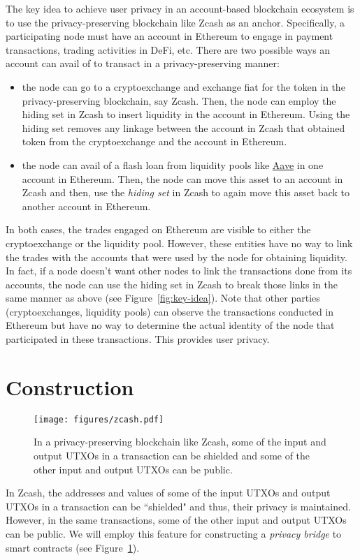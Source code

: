 \documentclass{article}
\begin{document}
The key idea to achieve user privacy in an account-based blockchain ecosystem is to use the privacy-preserving blockchain like Zcash as an anchor. Specifically, a participating node must have an account in Ethereum to engage in payment transactions, trading activities in DeFi, etc. There are two possible ways an account can avail of to transact in a privacy-preserving manner:
\begin{itemize}
    \item the node can go to a cryptoexchange and exchange  fiat  for the token in the privacy-preserving blockchain, say Zcash. Then, the node can employ the {hiding set}  in Zcash to insert liquidity in the account in Ethereum. Using the hiding set removes any linkage between the account in Zcash that obtained token from the cryptoexchange and the account in Ethereum.
    \item the node can avail of a flash loan from liquidity pools like \href{https://aave.com/}{Aave} in one account in Ethereum. Then, the node can move this asset to an account in  Zcash and then, use the {\em hiding set} in Zcash to again move this asset back to another account in Ethereum.
\end{itemize}
In both cases, the trades engaged on Ethereum  are visible to either the cryptoexchange or the liquidity pool. However, these entities have no way to link the trades with the accounts that were used by the node for obtaining liquidity. In fact, if a node doesn't want other nodes to link the transactions done from its accounts, the node can use the hiding set in Zcash to break those links in the same manner as above (see Figure~\ref{fig:key-idea}).
Note that other parties (cryptoexchanges, liquidity pools) can observe the transactions conducted in Ethereum but  have no way to determine the actual identity of the node that participated in these transactions. This provides user privacy.



\section*{Construction}
\begin{figure}
    \centering
    \texttt{[image: figures/zcash.pdf]}
    \caption{In a privacy-preserving blockchain like Zcash, some of the input and output UTXOs in a transaction can be shielded and some of the other input and output UTXOs can be public.}
    \label{fig:zcash}
\end{figure}
In Zcash, the addresses and values of some of the input UTXOs and output UTXOs in a transaction can be ``shielded" and thus, their privacy is maintained. However, in the same transactions, some of the other input and output UTXOs can be public. We will employ this feature for constructing a {\em privacy bridge} to smart contracts (see Figure~\ref{fig:zcash}).
\end{document}
